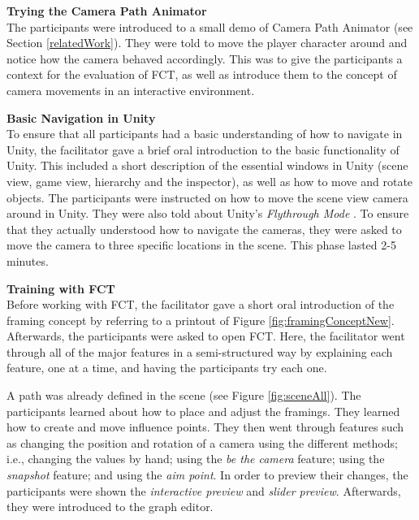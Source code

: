 \textbf{Trying the Camera Path Animator}\\
The participants were introduced to a small demo of Camera Path Animator \cite{unity_camTool} (see Section \ref{relatedWork}). They were told to move the player character around and notice how the camera behaved accordingly. This was to give the participants a context for the evaluation of FCT, as well as introduce them to the concept of camera movements in an interactive environment.




\textbf{Basic Navigation in Unity}\\
To ensure that all participants had a basic understanding of how to navigate in Unity, the facilitator gave a brief oral introduction to the basic functionality of Unity. This included a short description of the essential windows in Unity (scene view, game view, hierarchy and the inspector), as well as how to move and rotate objects. The participants were instructed on how to move the scene view camera around in Unity. They were also told about Unity's \textit{Flythrough Mode} \cite{unity_flyMode}. To ensure that they actually understood how to navigate the cameras, they were asked to move the camera to three specific locations in the scene. This phase lasted  2-5 minutes.


\textbf{Training with FCT}\\
Before working with FCT, the facilitator gave a short oral introduction of the framing concept by referring to a printout of Figure \ref{fig:framingConceptNew}. Afterwards, the participants were asked to open FCT. Here, the facilitator went through all of the major features in a semi-structured way by explaining each feature, one at a time, and having the participants try each one.

A path was already defined in the scene (see Figure \ref{fig:sceneAll}). The participants learned about how to place and adjust the framings. They learned how to create and move influence points. They then went through features such as changing the position and rotation of a camera using the different methods; i.e., changing the values by hand; using the \textit{be the camera} feature; using the \textit{snapshot} feature; and using the \textit{aim point}. In order to preview their changes, the participants were shown the \textit{interactive preview} and \textit{slider preview}. Afterwards, they were introduced to the graph editor.

